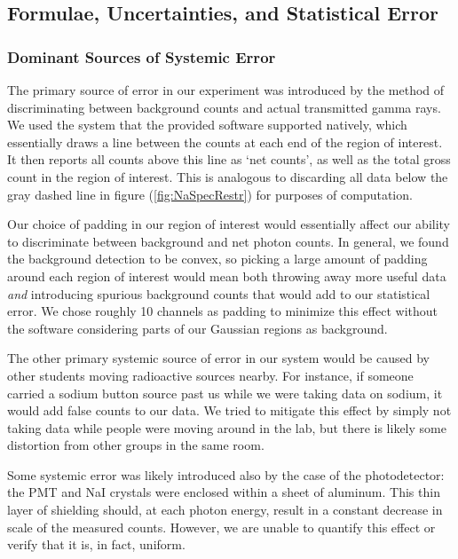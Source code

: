\documentclass[letter]{article}
\begin{document}
\subsection{Formulae, Uncertainties, and Statistical Error}

\subsubsection{Dominant Sources of Systemic Error} \label{sss:SysError}

The primary source of error in our experiment was introduced by the method of discriminating between background counts and actual transmitted gamma rays. We used the system that the provided software supported natively, which essentially draws a line between the counts at each end of the region of interest. It then reports all counts above this line as `net counts', as well as the total gross count in the region of interest. This is analogous to discarding all data below the gray dashed line in figure (\ref{fig:NaSpecRestr}) for purposes of computation.

Our choice of padding in our region of interest would essentially affect our ability to discriminate between background and net photon counts. In general, we found the background detection to be convex, so picking a large amount of padding around each region of interest would mean both throwing away more useful data \textit{and} introducing spurious background counts that would add to our statistical error. We chose roughly 10 channels as padding to minimize this effect without the software considering parts of our Gaussian regions as background.

The other primary systemic source of error in our system would be caused by other students moving radioactive sources nearby. For instance, if someone carried a sodium button source past us while we were taking data on sodium, it would add false counts to our data. We tried to mitigate this effect by simply not taking data while people were moving around in the lab, but there is likely some distortion from other groups in the same room.

Some systemic error was likely introduced also by the case of the photodetector: the PMT and NaI crystals were enclosed within a sheet of aluminum. This thin layer of shielding should, at each photon energy, result in a constant decrease in scale of the measured counts. However, we are unable to quantify this effect or verify that it is, in fact, uniform. 
\end{document}
